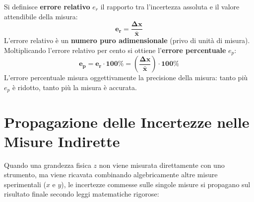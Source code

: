 \documentclass[11pt,a4paper,oneside]{report}
\begin{document}
\begin{definizione}
Si definisce \textbf{errore relativo} $e_r$ il rapporto tra l'incertezza assoluta e il valore attendibile della misura:
\[
\mathbf{e_r = \frac{\Delta x}{\bar{x}}}
\]
L'errore relativo è un \textbf{numero puro adimensionale} (privo di unità di misura). 
Moltiplicando l'errore relativo per cento si ottiene l'\textbf{errore percentuale} $e_p$:
\[
\mathbf{e_p = e_r \cdot 100\% = \left(\frac{\Delta x}{\bar{x}}\right) \cdot 100\%}
\]
L'errore percentuale misura oggettivamente la precisione della misura: tanto più $e_p$ è ridotto, tanto più la misura è accurata.
\end{definizione}

\section{Propagazione delle Incertezze nelle Misure Indirette}
Quando una grandezza fisica $z$ non viene misurata direttamente con uno strumento, ma viene ricavata combinando algebricamente altre misure sperimentali ($x$ e $y$), le incertezze commesse sulle singole misure si propagano sul risultato finale secondo leggi matematiche rigorose:
\end{document}
